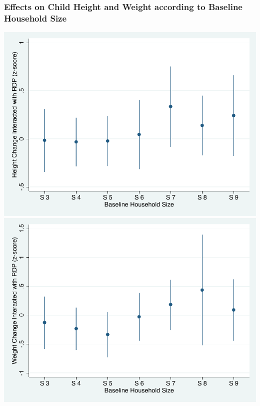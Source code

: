 \documentclass[aspectratio=149]{beamer}
\begin{document}
\begin{frame}
\frametitle{Effects on Child Height and Weight according to Baseline Household Size}
\begin{center}
\hspace*{-10mm}
  \includegraphics[scale = 0.49]{height_ch.pdf}
  \includegraphics[scale = 0.49]{weight_ch.pdf}
\end{center}
\end{frame}
\end{document}
